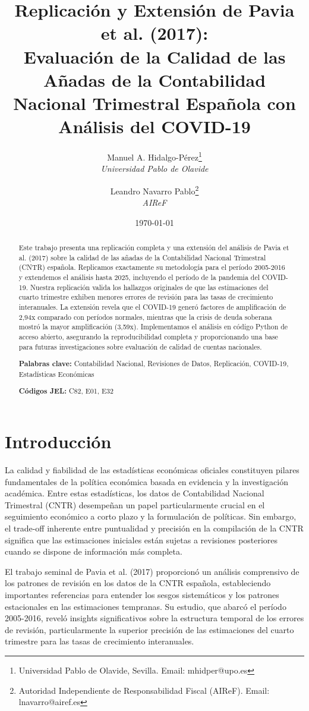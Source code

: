 \documentclass[12pt,a4paper]{article}
\title{\textbf{Replicación y Extensión de Pavia et al. (2017): \\Evaluación de la Calidad de las Añadas de la Contabilidad Nacional Trimestral Española con Análisis del COVID-19}}
\author{
    Manuel A. Hidalgo-Pérez\thanks{Universidad Pablo de Olavide, Sevilla. Email: mhidper@upo.es} \\ 
    \textit{Universidad Pablo de Olavide} \\[0.5em]
    \and
    Leandro Navarro Pablo\thanks{Autoridad Independiente de Responsabilidad Fiscal (AIReF). Email: lnavarro@airef.es} \\
    \textit{AIReF}
}
\date{\today}
\begin{document}
\maketitle

\begin{abstract}
\noindent Este trabajo presenta una replicación completa y una extensión del análisis de Pavia et al. (2017) sobre la calidad de las añadas de la Contabilidad Nacional Trimestral (CNTR) española. Replicamos exactamente su metodología para el período 2005-2016 y extendemos el análisis hasta 2025, incluyendo el período de la pandemia del COVID-19. Nuestra replicación valida los hallazgos originales de que las estimaciones del cuarto trimestre exhiben menores errores de revisión para las tasas de crecimiento interanuales. La extensión revela que el COVID-19 generó factores de amplificación de 2,94x comparado con períodos normales, mientras que la crisis de deuda soberana mostró la mayor amplificación (3,59x). Implementamos el análisis en código Python de acceso abierto, asegurando la reproducibilidad completa y proporcionando una base para futuras investigaciones sobre evaluación de calidad de cuentas nacionales.

\noindent \textbf{Palabras clave:} Contabilidad Nacional, Revisiones de Datos, Replicación, COVID-19, Estadísticas Económicas

\noindent \textbf{Códigos JEL:} C82, E01, E32
\end{abstract}

\newpage

\section{Introducción}

La calidad y fiabilidad de las estadísticas económicas oficiales constituyen pilares fundamentales de la política económica basada en evidencia y la investigación académica. Entre estas estadísticas, los datos de Contabilidad Nacional Trimestral (CNTR) desempeñan un papel particularmente crucial en el seguimiento económico a corto plazo y la formulación de políticas. Sin embargo, el trade-off inherente entre puntualidad y precisión en la compilación de la CNTR significa que las estimaciones iniciales están sujetas a revisiones posteriores cuando se dispone de información más completa.

El trabajo seminal de Pavia et al. (2017) proporcionó un análisis comprensivo de los patrones de revisión en los datos de la CNTR española, estableciendo importantes referencias para entender los sesgos sistemáticos y los patrones estacionales en las estimaciones tempranas. Su estudio, que abarcó el período 2005-2016, reveló insights significativos sobre la estructura temporal de los errores de revisión, particularmente la superior precisión de las estimaciones del cuarto trimestre para las tasas de crecimiento interanuales.
\end{document}
